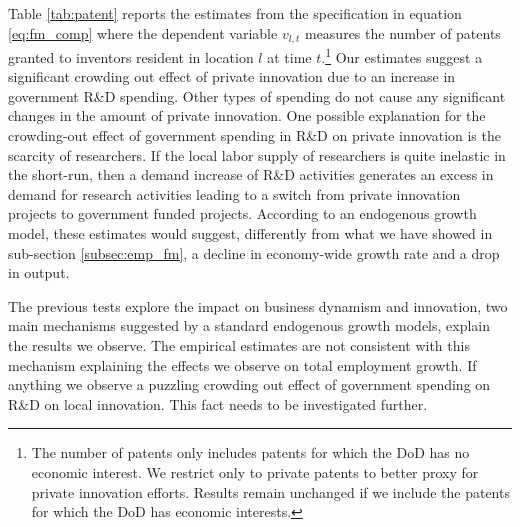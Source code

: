 \documentclass[dv_diss_main.tex]{subfiles}
\begin{document}
Table \ref{tab:patent} reports the estimates from the specification in equation \eqref{eq:fm_comp} where the dependent variable $v_{l,t}$ measures the number of patents granted to inventors resident in location $l$ at time $t$.\footnote{The number of patents only includes patents for which the DoD has no economic interest. We restrict only to private patents to better proxy for private innovation efforts. Results remain unchanged if we include the patents for which the DoD has economic interests.} Our estimates suggest a significant crowding out effect of private innovation due to an increase in government R\&D spending. Other types of spending do not cause any significant changes in the amount of private innovation. One possible explanation for the crowding-out effect of government spending in R\&D on private innovation is the scarcity of researchers. If the local labor supply of researchers is quite inelastic in the short-run, then a demand increase of R\&D activities generates an excess in demand for research activities leading to a switch from private innovation projects to government funded projects. According to an endogenous growth model, these estimates would suggest, differently from what we have showed in sub-section \ref{subsec:emp_fm}, a decline in economy-wide growth rate and a drop in output.

The previous tests explore the impact on business dynamism and innovation, two main mechanisms suggested by a standard endogenous growth models, explain the results we observe. The empirical estimates are not consistent with this mechanism explaining the effects we observe on total employment growth. If anything we observe a puzzling crowding out effect of government spending on R\&D on local innovation. This fact needs to be investigated further. 
\end{document}
